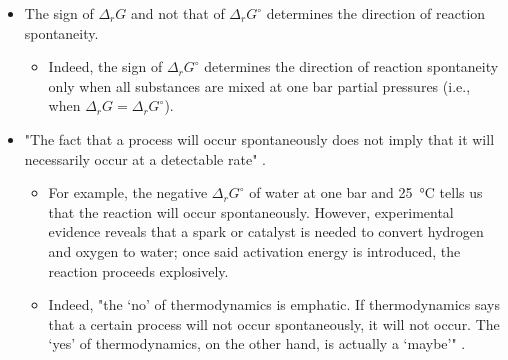 \documentclass[../notes.tex]{subfiles}
\begin{document}
\begin{itemize}
    \item The sign of $\Delta_rG$ and not that of $\Delta_rG^\circ$ determines the direction of reaction spontaneity.
    \begin{itemize}
        \item Indeed, the sign of $\Delta_rG^\circ$ determines the direction of reaction spontaneity only when all substances are mixed at one bar partial pressures (i.e., when $\Delta_rG=\Delta_rG^\circ$).
    \end{itemize}
    \item "The fact that a process will occur spontaneously does not imply that it will necessarily occur at a detectable rate" \parencite[977]{bib:McQuarrieSimon}.
    \begin{itemize}
        \item For example, the negative $\Delta_rG^\circ$ of water at one bar and \SI{25}{\celsius} tells us that the reaction  will occur spontaneously. However, experimental evidence reveals that a spark or catalyst is needed to convert hydrogen and oxygen to water; once said activation energy is introduced, the reaction proceeds explosively.
        \item Indeed, "the `no' of thermodynamics is emphatic. If thermodynamics says that a certain process will not occur spontaneously, it will not occur. The `yes' of thermodynamics, on the other hand, is actually a `maybe'" \parencite[977]{bib:McQuarrieSimon}.
    \end{itemize}
\end{itemize}
\end{document}
